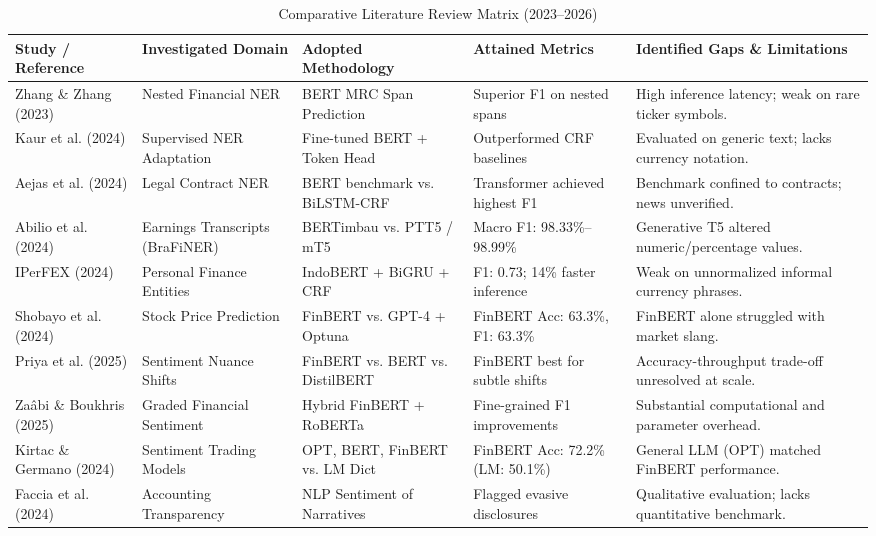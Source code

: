 \documentclass[conference]{IEEEtran}
\begin{document}
\begin{table}[t]
\caption{Comparative Literature Review Matrix (2023--2026)}
\label{tab_literature}
\centering
\footnotesize
\begin{tabular}{@{}L{2.4cm} L{2.8cm} L{3.8cm} L{3.0cm} L{5.4cm}@{}}
\toprule
\textbf{Study / Reference} & \textbf{Investigated Domain} & \textbf{Adopted Methodology} & \textbf{Attained Metrics} & \textbf{Identified Gaps \& Limitations} \\
\midrule
Zhang \& Zhang (2023) \cite{b1} & Nested Financial NER & BERT MRC Span Prediction & Superior F1 on nested spans & High inference latency; weak on rare ticker symbols. \\
\addlinespace[2pt]
Kaur et al. (2024) \cite{b2} & Supervised NER Adaptation & Fine-tuned BERT + Token Head & Outperformed CRF baselines & Evaluated on generic text; lacks currency notation. \\
\addlinespace[2pt]
Aejas et al. (2024) \cite{b3} & Legal Contract NER & BERT benchmark vs. BiLSTM-CRF & Transformer achieved highest F1 & Benchmark confined to contracts; news unverified. \\
\addlinespace[2pt]
Abilio et al. (2024) \cite{b4} & Earnings Transcripts (BraFiNER) & BERTimbau vs. PTT5 / mT5 & Macro F1: 98.33\%--98.99\% & Generative T5 altered numeric/percentage values. \\
\addlinespace[2pt]
IPerFEX (2024) \cite{b5} & Personal Finance Entities & IndoBERT + BiGRU + CRF & F1: 0.73; 14\% faster inference & Weak on unnormalized informal currency phrases. \\
\addlinespace[2pt]
Shobayo et al. (2024) \cite{b6} & Stock Price Prediction & FinBERT vs. GPT-4 + Optuna & FinBERT Acc: 63.3\%, F1: 63.3\% & FinBERT alone struggled with market slang. \\
\addlinespace[2pt]
Priya et al. (2025) \cite{b7} & Sentiment Nuance Shifts & FinBERT vs. BERT vs. DistilBERT & FinBERT best for subtle shifts & Accuracy-throughput trade-off unresolved at scale. \\
\addlinespace[2pt]
Zaâbi \& Boukhris (2025) \cite{b8} & Graded Financial Sentiment & Hybrid FinBERT + RoBERTa & Fine-grained F1 improvements & Substantial computational and parameter overhead. \\
\addlinespace[2pt]
Kirtac \& Germano (2024) \cite{b9} & Sentiment Trading Models & OPT, BERT, FinBERT vs. LM Dict & FinBERT Acc: 72.2\% (LM: 50.1\%) & General LLM (OPT) matched FinBERT performance. \\
\addlinespace[2pt]
Faccia et al. (2024) \cite{b10} & Accounting Transparency & NLP Sentiment of Narratives & Flagged evasive disclosures & Qualitative evaluation; lacks quantitative benchmark. \\

\end{tabular}
\end{table}
\end{document}

